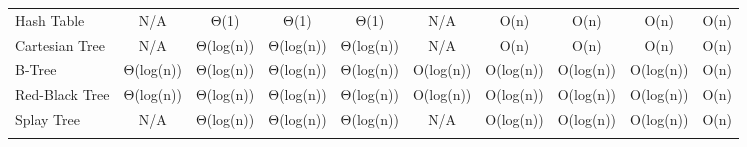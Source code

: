 \begin{table}[]
\begin{tabular}{lccccccccc}
    \cellcolor[HTML]{F1ECB6}Hash Table                                                                  & \cellcolor[HTML]{D4D4D4}N/A       & \cellcolor[HTML]{3EC509}Θ(1)      & \cellcolor[HTML]{3EC509}Θ(1)      & \cellcolor[HTML]{3EC509}Θ(1)      & \cellcolor[HTML]{D4D4D4}N/A   & \cellcolor[HTML]{FFFF10}O(n)  & \cellcolor[HTML]{FFFF10}O(n)     & \cellcolor[HTML]{FFFF10}O(n)    & \cellcolor[HTML]{FFFF10}O(n)                                           \\
    \cellcolor[HTML]{F1ECB6}Cartesian Tree                                                              & \cellcolor[HTML]{D4D4D4}N/A       & \cellcolor[HTML]{B1EA0D}Θ(log(n)) & \cellcolor[HTML]{B1EA0D}Θ(log(n)) & \cellcolor[HTML]{B1EA0D}Θ(log(n)) & \cellcolor[HTML]{D4D4D4}N/A   & \cellcolor[HTML]{FFFF10}O(n)  & \cellcolor[HTML]{FFFF10}O(n)     & \cellcolor[HTML]{FFFF10}O(n)    & \cellcolor[HTML]{FFFF10}O(n)                                           \\
    \rowcolor[HTML]{B1EA0D} 
    \cellcolor[HTML]{F1ECB6}B-Tree                                                                      & Θ(log(n))                         & Θ(log(n))                         & Θ(log(n))                         & Θ(log(n))                         & O(log(n))                     & O(log(n))                     & O(log(n))                        & O(log(n))                       & \cellcolor[HTML]{FFFF10}O(n)                                           \\
    \rowcolor[HTML]{B1EA0D} 
    \cellcolor[HTML]{F1ECB6}Red-Black Tree                                                              & Θ(log(n))                         & Θ(log(n))                         & Θ(log(n))                         & Θ(log(n))                         & O(log(n))                     & O(log(n))                     & O(log(n))                        & O(log(n))                       & \cellcolor[HTML]{FFFF10}O(n)                                           \\
    \rowcolor[HTML]{B1EA0D} 
    \cellcolor[HTML]{F1ECB6}Splay Tree                                                                  & \cellcolor[HTML]{D4D4D4}N/A       & Θ(log(n))                         & Θ(log(n))                         & Θ(log(n))                         & \cellcolor[HTML]{D4D4D4}N/A   & O(log(n))                     & O(log(n))                        & O(log(n))                       & \cellcolor[HTML]{FFFF10}O(n)                                           \\
    \rowcolor[HTML]{B1EA0D} 

\end{tabular}
\end{table}
